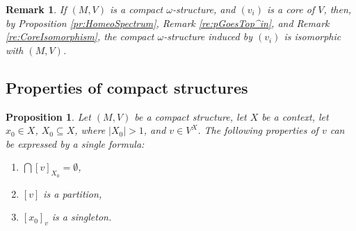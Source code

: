 \documentclass[12pt]{amsart}
\theoremstyle{plain}
\newtheorem{remark}[theorem]{\bf Remark}
\newtheorem{proposition}[theorem]{\bf Proposition}
\newcommand \PPb{\mathbb{P}}
\begin{document}
\begin{remark}
\label{re:SpectraAreEnough}
If $(M,V)$ is a compact $\omega$-structure, and $(v_i)$ is a core of $V$, then, by Proposition \ref{pr:HomeoSpectrum}, Remark \ref{re:pGoesTop^in}, and Remark \ref{re:CoreIsomorphism}, the compact $\omega$-structure induced by $(v_i)$ is isomorphic with $(M,V)$.
\end{remark}

	\subsection{Properties of compact structures}

\begin{proposition}
	\label{pr:FormulaProp}	
	Let $(M,V)$ be a compact structure, let $X$ be a context, let $x_0 \in X$, $X_0 \subseteq X$, where $|X_0|>1$,  and $v \in V^X$. The following properties of $v$ can be expressed by a single formula:
	
	\begin{enumerate}
		\item $\bigcap [v]_{X_0}= \emptyset$, 
		\item $[v]$ is a partition,
		\item $[x_0]_v$ is a singleton.
	\end{enumerate}
\end{proposition}		
\end{document}
